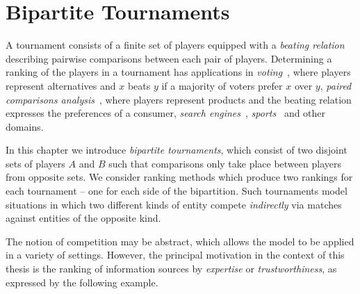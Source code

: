 \chapter{Bipartite Tournaments}
\label{chapter_bipartite_tournaments}

A tournament consists of a finite set of players equipped with a \emph{beating
relation} describing pairwise comparisons between each pair of players.
Determining a ranking of the players in a tournament has applications in
\emph{voting}~\cite{brandt2016a}, where players represent alternatives and $x$
beats $y$ if a majority of voters prefer $x$ over $y$, \emph{paired comparisons
analysis}~\cite{gonzalez2014paired}, where players represent products and the
beating relation expresses the preferences of a consumer, \emph{search
engines}~\cite{slutzki2006scoring}, \emph{sports}~\cite{bozoki2016application}
and other domains.

In this chapter we introduce \emph{bipartite tournaments}, which consist of two
disjoint sets of players $A$ and $B$ such that comparisons only take place
between players from opposite sets. We consider ranking methods which produce
two rankings for each tournament -- one for each side of the bipartition. Such
tournaments model situations in which two different kinds of entity compete
\emph{indirectly} via matches against entities of the opposite kind.

The notion of competition may be abstract, which allows the model to be applied
in a variety of settings. However, the principal motivation in the context of this
thesis is the ranking of information sources by \emph{expertise} or
\emph{trustworthiness}, as expressed by the following example.

